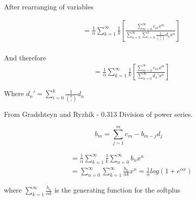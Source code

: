After rearranging of variables

\begin{align*}
	& = \frac{1}{\alpha}\sum\limits_{k=1}^{\infty}\frac{1}{k}\left[ \frac{\sum\limits_{m=0}^{\infty}c_{m}x^{m}}{\sum\limits_{n=0}^{\infty}\sum\limits_{i=0}^{k}\frac{1}{{k \choose i}}d_{n}x^{n}} \right] \\
\end{align*}

And therefore
\begin{align*}
	& = \frac{1}{\alpha}\sum\limits_{k=1}^{\infty}\frac{1}{k}\left[ \frac{\sum\limits_{m=0}^{\infty}c_{m}x^{m}}{\sum\limits_{n=0}^{\infty}d_{n}'x^{n}} \right]
\end{align*}

Where $d_{n}' = \sum\limits_{i=0}^{k}\frac{1}{{k \choose i}}d_{n}$

From Gradshteyn and Ryzhik - 0.313 Division of power series.

\begin{equation}
	b_{m} = \sum\limits_{j=1}^{m}c_{m}-b_{m-j}d_{j}
\end{equation}

\begin{align*}
	& = \frac{1}{\alpha}\sum\limits_{k=1}^{\infty}\frac{1}{k}\sum\limits_{n=0}^{\infty}b_{n}x^{n} \\
	& = \sum\limits_{n=0}^{\infty}\sum\limits_{k=1}^{\infty}\frac{b_{n}}{\alpha k}x^{n}=\frac{1}{\alpha}log(1+e^{\alpha x})
\end{align*}

where $\sum\limits_{k=1}^{\infty}\frac{b_{n}}{\alpha k}$ is the generating function for the softplus
